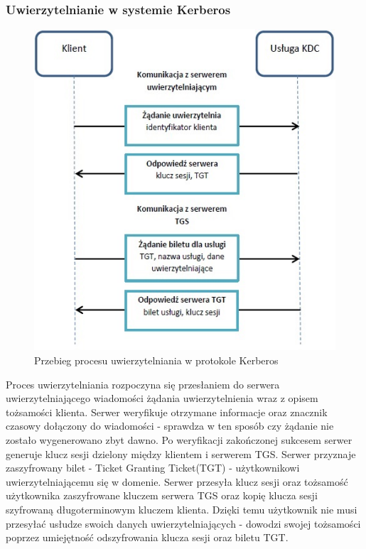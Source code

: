 		\subsubsection{Uwierzytelnianie w systemie Kerberos}

			\begin{figure}[h]
				\centering
					\includegraphics{img/kerberos.jpg}
				\caption{Przebieg procesu uwierzytelniania w protokole Kerberos}
				\label{Przebieg procesu uwierzytelniania w protokole Kerberos}
			\end{figure}

			Proces uwierzytelniania rozpoczyna się przesłaniem  do serwera uwierzytelniającego wiadomości żądania uwierzytelnienia wraz z opisem tożsamości klienta\cite{Garman03}. Serwer weryfikuje otrzymane informacje oraz znacznik czasowy dołączony do wiadomości - sprawdza w ten sposób czy żądanie nie zostało wygenerowano zbyt dawno. Po weryfikacji zakończonej sukcesem serwer generuje klucz sesji dzielony między klientem i serwerem TGS. Serwer przyznaje zaszyfrowany bilet - Ticket Granting Ticket(TGT) - użytkownikowi uwierzytelniającemu się w domenie. Serwer przesyła klucz sesji oraz tożsamość użytkownika zaszyfrowane kluczem serwera TGS oraz kopię klucza sesji szyfrowaną długoterminowym kluczem klienta. Dzięki temu użytkownik nie musi przesyłać usłudze swoich danych uwierzytelniających - dowodzi swojej tożsamości poprzez umiejętność odszyfrowania klucza sesji oraz biletu TGT. 

